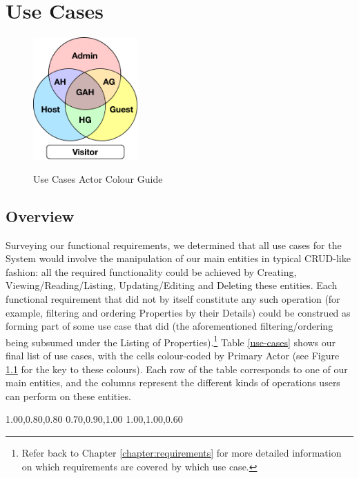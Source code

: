 \chapter{Use Cases}
\label{chapter:use cases}

\begin{figure}
    \vspace{0cm}
    \includegraphics[width=4cm]{img/usecase_venn.png} \\[0.5em]
    \vspace{-1.2cm}
    \caption{Use Cases Actor Colour Guide}
    \label{use-case-colours}
    \end{figure} 

\section{Overview}
Surveying our functional requirements, we determined that all use cases for the System would involve the manipulation of our main entities in typical CRUD-like fashion: all the required functionality could be achieved by Creating, Viewing/Reading/Listing, Updating/Editing and Deleting these entities. Each functional requirement that did not by itself constitute any such operation (for example, filtering and ordering Properties by their Details) could be construed as forming part of some use case that did (the aforementioned filtering/ordering being subsumed under the Listing of Properties).\footnote{Refer back to Chapter \ref{chapter:requirements} for more detailed information on which requirements are covered by which use case.} Table \ref{use-cases} shows our final list of use cases, with the cells colour-coded by Primary Actor (see Figure \ref{use-case-colours} for the key to these colours). Each row of the table corresponds to one of our main entities, and the columns represent the different kinds of operations users can perform on these entities.

\definecolor{A}{rgb} {1.00,0.80,0.80}
\definecolor{H}{rgb} {0.70,0.90,1.00}
\definecolor{G}{rgb} {1.00,1.00,0.60}

